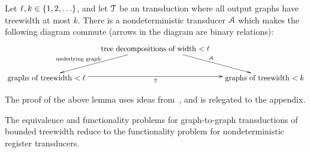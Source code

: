 \begin{lemma}\label{lem:transduction-to-registers}
    Let $\ell, k \in \{1,2,\ldots\}$, and  let ${\mathcal T}$ be an \mso transduction where all output graphs have treewidth at most $k$. There is a nondeterministic  transducer ${\mathcal A}$ which makes the following diagram commute (arrows in the diagram are binary relations):
    \begin{align*}
    \xymatrix@C=0.5cm{
         & \txt{tree decompositions of width $< \ell$}
        \ar[dl]_-{\txt{\scriptsize underlying graph \qquad \qquad}}
         \ar[dr]^\Aa\\
        \txt{graphs of treewidth $< \ell$}\ar[rr]_\Tt & &
        \txt{graphs  of treewidth $< k$} 
    }
    \end{align*}
\end{lemma}
The proof of the above lemma uses ideas from~\cite{courcelleMonadicSecondorderLogic1990,bloem_comparison_2000,alurStreamingTreeTransducers2017}, and  is relegated to the appendix.  

\begin{corollary}
The equivalence and functionality  problems for graph-to-graph \mso transductions of bounded treewidth  reduce to the functionality problem for nondeterministic  register transducers. 
\end{corollary}


